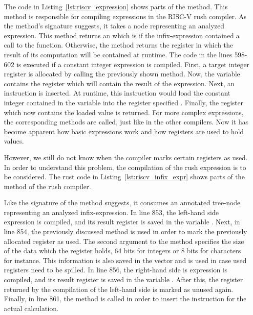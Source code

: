 
The code in Listing~\ref{lst:riscv_expression} shows parts of the  method.
This method is responsible for compiling expressions in the RISC-V rush compiler.
As the method's signature suggests, it takes a node representing an analyzed expression.
This method returns an  which is  if the infix-expression contained a call to the  function.
Otherwise, the method returns the register in which the result of its computation will be contained at runtime.
The code in the lines 598-602 is executed if a constant integer expression is compiled.
First, a target integer register is allocated by calling the previously shown  method.
Now, the  variable contains the register which will contain the result of the expression.
Next, an  instruction is inserted.
At runtime, this instruction would load the constant integer contained in the variable  into the register specified .
Finally, the register which now contains the loaded value is returned.
For more complex expressions, the corresponding methods are called, just like in the other compilers.
Now it has become apparent how basic expressions work and how registers are used to hold values.

However, we still do not know when the compiler marks certain registers as used.
In order to understand this problem, the compilation of the rush expression  is to be considered.
The rust code in Listing~\ref{lst:riscv_infix_expr} shows parts of the  method of the rush compiler.


Like the signature of the method suggests, it consumes an annotated tree-node representing an analyzed infix-expression.
In line 853, the left-hand side expression is compiled, and its result register is saved in the variable .
Next, in line 854, the previously discussed  method is used in order to mark the previously allocated register as used.
The second argument to the method specifies the size of the data which the register holds, 64 bits for integers or 8 bits for characters for instance.
This information is also saved in the  vector and is used in case used registers need to be spilled.
In line 856, the right-hand side is expression is compiled, and its result register is saved in the variable .
After this, the register returned by the compilation of the left-hand side is marked as unused again.
Finally, in line 861, the  method is called in order to insert the instruction for the actual calculation.

